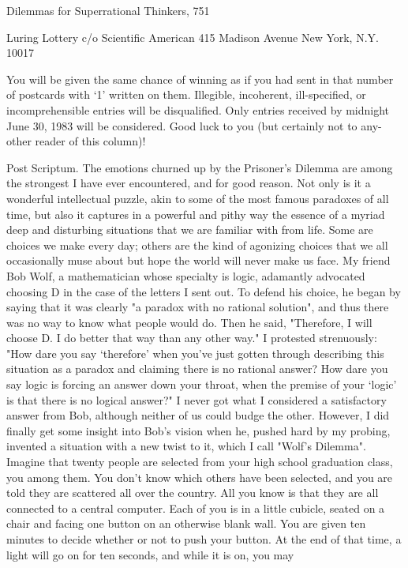 Dilemmas for Superrational Thinkers,                                                   751

       Luring Lottery
        c/o Scientific American
           415 Madison Avenue
             New York, N.Y. 10017

You will be given the same chance of winning as if you had sent in that number of
postcards with `1' written on them. Illegible, incoherent, ill-specified, or
incomprehensible entries will be disqualified. Only entries received by midnight June
30, 1983 will be considered. Good luck to you (but certainly not to any-other reader
of this column)!


Post Scriptum.
        The emotions churned up by the Prisoner's Dilemma are among the strongest I
have ever encountered, and for good reason. Not only is it a wonderful intellectual
puzzle, akin to some of the most famous paradoxes of all time, but also it captures in a
powerful and pithy way the essence of a myriad deep and disturbing situations that we
are familiar with from life. Some are choices we make every day; others are the kind
of agonizing choices that we all occasionally muse about but hope the world will
never make us face.
        My friend Bob Wolf, a mathematician whose specialty is logic, adamantly
advocated choosing D in the case of the letters I sent out. To defend his choice, he
began by saying that it was clearly "a paradox with no rational solution", and thus
there was no way to know what people would do. Then he said, "Therefore, I will
choose D. I do better that way than any other way." I protested strenuously: "How
dare you say `therefore' when you've just gotten through describing this situation as a
paradox and claiming there is no rational answer? How dare you say logic is forcing
an answer down your throat, when the premise of your `logic' is that there is no
logical answer?" I never got what I considered a satisfactory answer from Bob,
although neither of us could budge the other. However, I did finally get some insight
into Bob's vision when he, pushed hard by my probing, invented a situation with a
new twist to it, which I call "Wolf's Dilemma".
        Imagine that twenty people are selected from your high school graduation
class, you among them. You don't know which others have been selected, and you are
told they are scattered all over the country. All you know is that they are all connected
to a central computer. Each of you is in a little cubicle, seated on a chair and facing
one button on an otherwise blank wall. You are given ten minutes to decide whether
or not to push your button. At the end of that time, a light will go on for ten seconds,
and while it is on, you may




